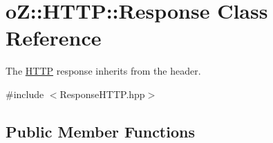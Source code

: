 \hypertarget{classo_z_1_1_h_t_t_p_1_1_response}{}\section{oZ\+::H\+T\+TP\+::Response Class Reference}
\label{classo_z_1_1_h_t_t_p_1_1_response}


The \mbox{\hyperlink{namespaceo_z_1_1_h_t_t_p}{H\+T\+TP}} response inherits from the header.  




{\ttfamily \#include $<$Response\+H\+T\+T\+P.\+hpp$>$}

\subsection*{Public Member Functions}
